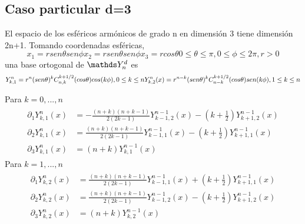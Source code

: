 \subsection{Caso particular d=3}
El espacio de los esféricos armónicos de grado n en dimensión 3 tiene dimensión 2n+1. Tomando coordenadas esféricas,
$$
x_1 = r sen \theta sen \phi
x_2 = r sen \theta sen \phi
x_3 = r cos \theta
0\le \theta \le \pi,0\le\phi\le2\pi,r>0
$$
una base ortogonal de $\spharm$ es
$$
Y^n_ {k,1} = r^n(sen \theta)^kC_{n,k}^{k+1/2}(cos \theta) cos(k\phi), 0\le k\le n \\
Y^n_{k,2}(x) = r^{n-k}(sen\theta)^kC^{k+1/2}_{n-k}(cos\theta)sen(k\phi), 1\le k\le n
$$ 
\begin{prop} Para $k=0,...,n$
	\begin{gather*} 
		\begin{aligned}
			\partial_1Y^{n}_{k,1}(x) &= -\frac{(n+k)(n+k-1)}{2(2k-1)}Y^{n-1}_{k-1,2}(x)-(k+\frac{1}{2})Y^{n-1}_ {k+1,2}(x) \\
		\partial_2Y^{n}_{k,1}(x) &= \frac{(n+k)(n+k-1)}{2(2k-1)}Y^{n-1}_{k-1,1}(x)-(k+\frac{1}{2})Y^{n-1}_ {k+1,1}(x) \\
		\partial_3 Y_{k,1}^{n}(x) &=(n+k)Y_{k,1}^{n-1}(x)
			\end{aligned}
	\end{gather*}
 Para $k=1,...,n$
	\begin{gather*}
	\begin{aligned}
	\partial_1Y^{n}_{k,2}(x) &= \frac{(n+k)(n+k-1)}{2(2k-1)}Y^{n-1}_{k-1,1}(x)+(k+\frac{1}{2})Y^{n-1}_ {k+1,1}(x)\\
	\partial_2Y^{n}_{k,2}(x) &= \frac{(n+k)(n+k-1)}{2(2k-1)}Y^{n-1}_{k-1,2}(x)-(k+\frac{1}{2})Y^{n-1}_ {k+1,2}(x)\\
	\partial_3 Y_{k,2}^{n}(x) &=(n+k)Y_{k,2}^{n-1}(x)
		\end{aligned}
	\end{gather*}

	
\end{prop}